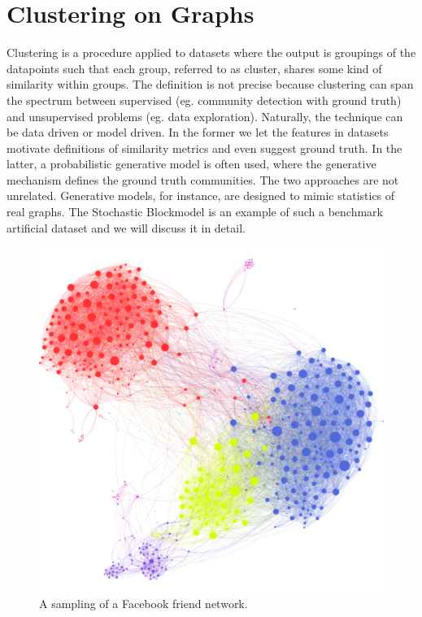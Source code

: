 \chapter{Clustering on Graphs}

Clustering is a procedure applied to datasets where the output is groupings of the datapoints such that each group, referred to as cluster, shares some kind of similarity within groups. The definition is not precise because clustering can span the spectrum between supervised (eg. community detection with ground truth) and unsupervised problems (eg. data exploration).  Naturally, the technique can be data driven or model driven.  In the former we let the  features in datasets motivate definitions of similarity metrics and even suggest ground truth.  In the latter, a probabilistic generative model is often used, where the generative mechanism defines the ground truth communities.  The two approaches are not unrelated.  Generative models, for instance, are designed to mimic statistics of real graphs.  The Stochastic Blockmodel is an example of such a benchmark artificial dataset and we will discuss it in detail.  


\begin{figure}[h]
\begin{center}
  \includegraphics[scale=0.15]{social_network.png}
  \caption{A sampling of a Facebook friend network.\cite{social_network}}
  \label{fig:socialnet}
 \end{center}
\end{figure}

